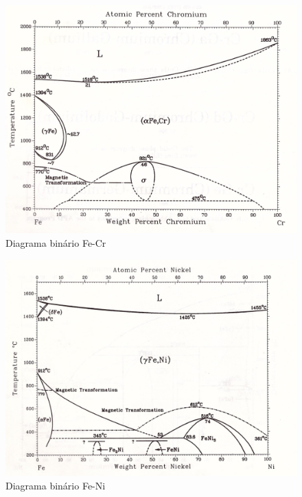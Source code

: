 \documentclass[brazil,tf,epusp]{usp}  %
\begin{document}
\begin{figure}
  \includegraphics[width=1.1\textwidth]{img/Fe-Cr.jpg}
  \caption{Diagrama binário Fe-Cr \cite{Massalski1996v1}}
  \label{fig:bin_fe-cr}
\end{figure}

\begin{figure}
  \includegraphics[width=1.1\textwidth]{img/Fe-Ni.jpg}
  \caption{Diagrama binário Fe-Ni \cite{Massalski1996v1}}
  \label{fig:bin_fe-ni}
\end{figure}
\end{document}
